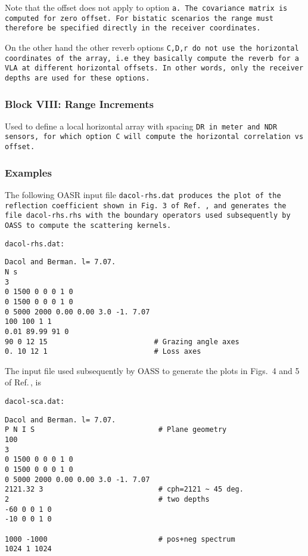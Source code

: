 Note that the offset does not apply to option
\tt a. \rm The covariance matrix is computed for zero offset. For
bistatic scenarios the range must therefore be specified directly in
the receiver coordinates. 

On the other hand the other reverb options
\tt C,D,r \rm do not use the horizontal coordinates of the array,
i.e they basically compute the reverb for a VLA at
different horizontal offsets. In other words, only the receiver depths
are used for these options.

\subsubsection{Block VIII: Range Increments}

Used to define a local horizontal array with spacing \tt DR \rm in
meter and
\tt NDR \rm sensors, for which option \tt C \rm will compute the
horizontal correlation vs offset.

\subsubsection{Examples}
\label{sec:oassex}

The following OASR input file \tt dacol-rhs.dat \rm produces the 
plot of the reflection coefficient shown in Fig.~3 of
Ref.~\cite{ks:jasa89}, and generates the file \tt dacol-rhs.rhs \rm
with the boundary operators used subsequently by  OASS to compute the
scattering kernels.

\noindent \tt dacol-rhs.dat: \rm

\small
\begin{verbatim}
Dacol and Berman. l= 7.07. 
N s
3
0 1500 0 0 0 1 0
0 1500 0 0 0 1 0
0 5000 2000 0.00 0.00 3.0 -1. 7.07 
100 100 1 1
0.01 89.99 91 0
90 0 12 15                         # Grazing angle axes
0. 10 12 1                         # Loss axes
\end{verbatim}

The input file used subsequently by OASS to generate the plots in 
Figs.~4 and 5 of Ref.\,\cite{ks:jasa89}, is

\noindent \tt dacol-sca.dat: \rm

\small
\begin{verbatim}
Dacol and Berman. l= 7.07.
P N I S                             # Plane geometry
100
3
0 1500 0 0 0 1 0
0 1500 0 0 0 1 0
0 5000 2000 0.00 0.00 3.0 -1. 7.07
2121.32 3                           # cph=2121 ~ 45 deg.
2                                   # two depths
-60 0 0 1 0
-10 0 0 1 0

1000 -1000                          # pos+neg spectrum
1024 1 1024
\end{verbatim}








